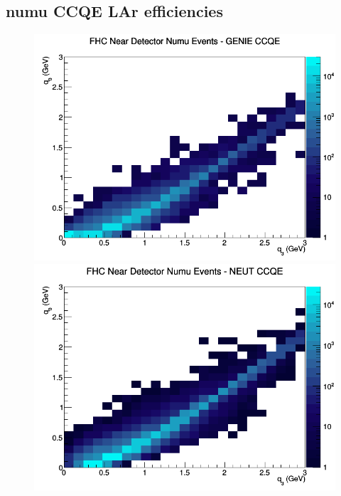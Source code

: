 \documentclass[12pt]{article}
\begin{document}
\subsection{numu CCQE LAr efficiencies}
\begin{figure}[h]
\includegraphics[width=\linewidth]{eff_q0_q3/LAr/CCQE_FHC_ND_numu_q3_q0_GENIE.png}
\endminipage
{}
\includegraphics[width=\linewidth]{eff_q0_q3/LAr/CCQE_FHC_ND_numu_q3_q0_NEUT.png}
\endminipage
{}

\end{figure}
\end{document}
